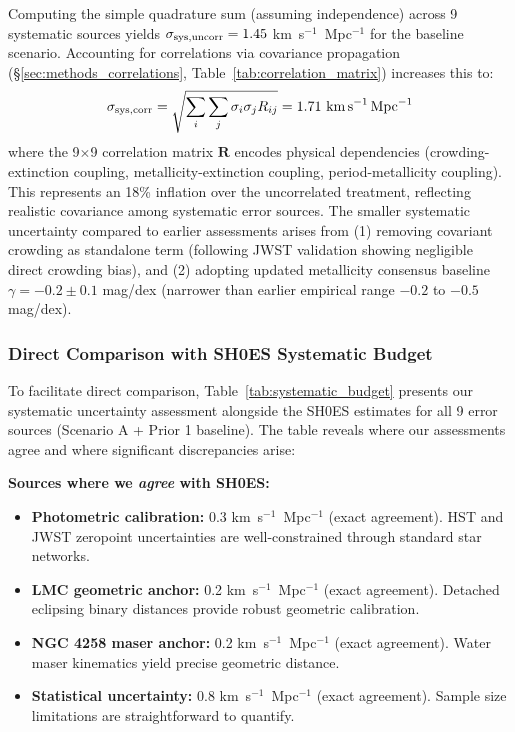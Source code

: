 \documentclass[preprint, linenumbers]{aastex701}
\begin{document}
Computing the simple quadrature sum (assuming independence) across 9 systematic sources yields $\sigma_{\rm sys,uncorr} = 1.45$ km~s$^{-1}$~Mpc$^{-1}$ for the baseline scenario. Accounting for correlations via covariance propagation (\S\ref{sec:methods_correlations}, Table~\ref{tab:correlation_matrix}) increases this to:
\begin{equation}
\sigma_{\rm sys,corr} = \sqrt{\sum_i \sum_j \sigma_i \sigma_j R_{ij}} = 1.71~\mathrm{km\,s}^{-1}\,\mathrm{Mpc}^{-1}
\end{equation}
where the 9$\times$9 correlation matrix $\mathbf{R}$ encodes physical dependencies (crowding-extinction coupling, metallicity-extinction coupling, period-metallicity coupling). This represents an 18\% inflation over the uncorrelated treatment, reflecting realistic covariance among systematic error sources. The smaller systematic uncertainty compared to earlier assessments arises from (1) removing covariant crowding as standalone term (following JWST validation showing negligible direct crowding bias), and (2) adopting updated metallicity consensus baseline $\gamma=-0.2\pm0.1$ mag/dex (narrower than earlier empirical range $-0.2$ to $-0.5$ mag/dex).

\subsubsection{Direct Comparison with SH0ES Systematic Budget}

To facilitate direct comparison, Table~\ref{tab:systematic_budget} presents our systematic uncertainty assessment alongside the SH0ES estimates for all 9 error sources (Scenario A + Prior 1 baseline). The table reveals where our assessments agree and where significant discrepancies arise:

\textbf{Sources where we \textit{agree} with SH0ES:}
\begin{itemize}
\item \textbf{Photometric calibration:} 0.3 km~s$^{-1}$~Mpc$^{-1}$ (exact agreement). HST and JWST zeropoint uncertainties are well-constrained through standard star networks.
\item \textbf{LMC geometric anchor:} 0.2 km~s$^{-1}$~Mpc$^{-1}$ (exact agreement). Detached eclipsing binary distances provide robust geometric calibration.
\item \textbf{NGC 4258 maser anchor:} 0.2 km~s$^{-1}$~Mpc$^{-1}$ (exact agreement). Water maser kinematics yield precise geometric distance.
\item \textbf{Statistical uncertainty:} 0.8 km~s$^{-1}$~Mpc$^{-1}$ (exact agreement). Sample size limitations are straightforward to quantify.
\end{itemize}
\end{document}
